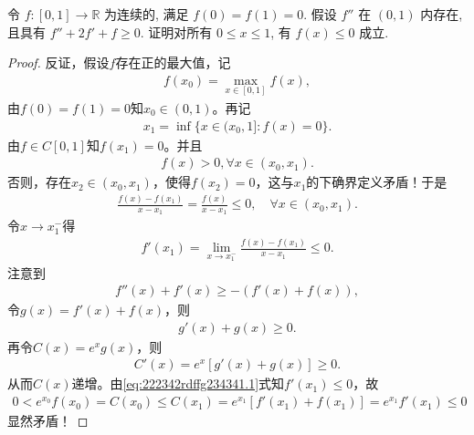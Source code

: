 \documentclass[../../main.tex]{subfiles}%
\begin{document}
\begin{example}
令 $f:[0,1] \to \mathbb{R}$ 为连续的, 满足 $f(0) = f(1) = 0$. 假设 $f''$ 在 $(0,1)$ 内存在, 且具有 $f''+2f'+f \geqslant 0$. 证明对所有 $0 \leqslant x \leqslant 1$, 有 $f(x) \leqslant 0$ 成立.
\end{example}
\begin{proof}
反证，假设$f$存在正的最大值，记
\begin{align*}
f(x_0) = \max_{x \in [0,1]} f(x),
\end{align*}
由$f(0) = f(1) = 0$知$x_0 \in (0,1)$。再记
\begin{align*}
x_1 = \inf \{ x \in (x_0,1] : f(x) = 0 \}.
\end{align*}
由$f \in C[0,1]$知$f(x_1) = 0$。并且
\begin{align*}
f(x) > 0, \forall x \in (x_0, x_1).
\end{align*}
否则，存在$x_2 \in (x_0, x_1)$，使得$f(x_2) = 0$，这与$x_1$的下确界定义矛盾！于是
\begin{align*}
\frac{f(x) - f(x_1)}{x - x_1} = \frac{f(x)}{x - x_1} \leqslant 0, \quad \forall x \in (x_0, x_1).
\end{align*}
令$x \to x_1^-$得
\begin{align}
f'(x_1) = \lim_{x \to x_1^-} \frac{f(x) - f(x_1)}{x - x_1} \leqslant 0. \label{eq:222342rdffg234341.1}
\end{align}
注意到
\begin{align*}
f''(x) + f'(x) \geqslant -(f'(x) + f(x)),
\end{align*}
令$g(x) = f'(x) + f(x)$，则
\begin{align*}
g'(x) + g(x) \geqslant 0.
\end{align*}
再令$C(x) = e^x g(x)$，则
\begin{align*}
C'(x) = e^x [g'(x) + g(x)] \geqslant 0.
\end{align*}
从而$C(x)$递增。由\eqref{eq:222342rdffg234341.1}式知$f'(x_1) \leqslant 0$，故
\begin{align*}
0 < e^{x_0} f(x_0) = C(x_0) \leqslant C(x_1) = e^{x_1} [f'(x_1) + f(x_1)] = e^{x_1} f'(x_1) \leqslant 0
\end{align*}
显然矛盾！
\end{proof}
\end{document}

